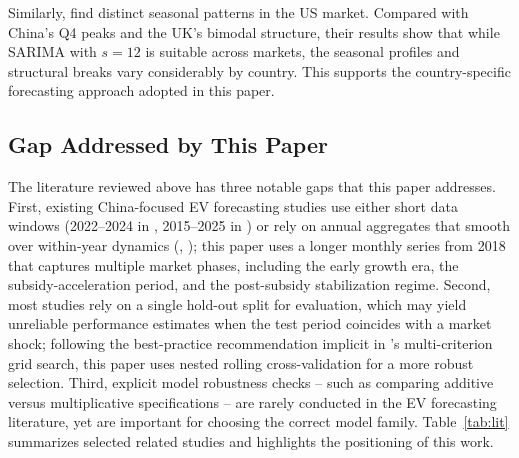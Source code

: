 \documentclass[12pt]{article}
\begin{document}
Similarly, \citet{cetin2024} find distinct seasonal patterns in the US market. Compared with China’s Q4 peaks and the UK’s bimodal structure, their results show that while SARIMA with $s = 12$ is suitable across markets, the seasonal profiles and structural breaks vary considerably by country. This supports the country-specific forecasting approach adopted in this paper.

\subsection{Gap Addressed by This Paper}

The literature reviewed above has three notable gaps that this paper addresses. First, existing China-focused EV forecasting studies use either short data windows (2022--2024 in \citealt{chen2025}, 2015--2025 in \citealt{liang2025}) or rely on annual aggregates that smooth over within-year dynamics (\citealt{ge2024}, \citealt{yang2024}); this paper uses a longer monthly series from 2018 that captures multiple market phases, including the early growth era, the subsidy-acceleration period, and the post-subsidy stabilization regime. Second, most studies rely on a single hold-out split for evaluation, which may yield unreliable performance estimates when the test period coincides with a market shock; following the best-practice recommendation implicit in \citet{cetin2024}'s multi-criterion grid search, this paper uses nested rolling cross-validation for a more robust selection. Third, explicit model robustness checks -- such as comparing additive versus multiplicative specifications -- are rarely conducted in the EV forecasting literature, yet are important for choosing the correct model family. Table~\ref{tab:lit} summarizes selected related studies and highlights the positioning of this work.
\end{document}
